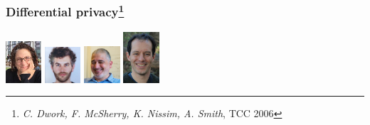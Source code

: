 \documentclass{beamer}
\begin{document}
\begin{frame}
  \centering
  \frametitle{Differential privacy\footnote{\emph{C. Dwork, F. McSherry, K. Nissim, A. Smith}, TCC 2006}}
  \includegraphics[width=0.1\textwidth]{figures/dwork} \hspace{1em}
  \includegraphics[width=0.1\textwidth]{figures/mcsherry} \hspace{1em}
  \includegraphics[width=0.1\textwidth]{figures/nissim} \hspace{1em}
  \includegraphics[width=0.1\textwidth]{figures/smith}
  

\end{frame}
\end{document}
